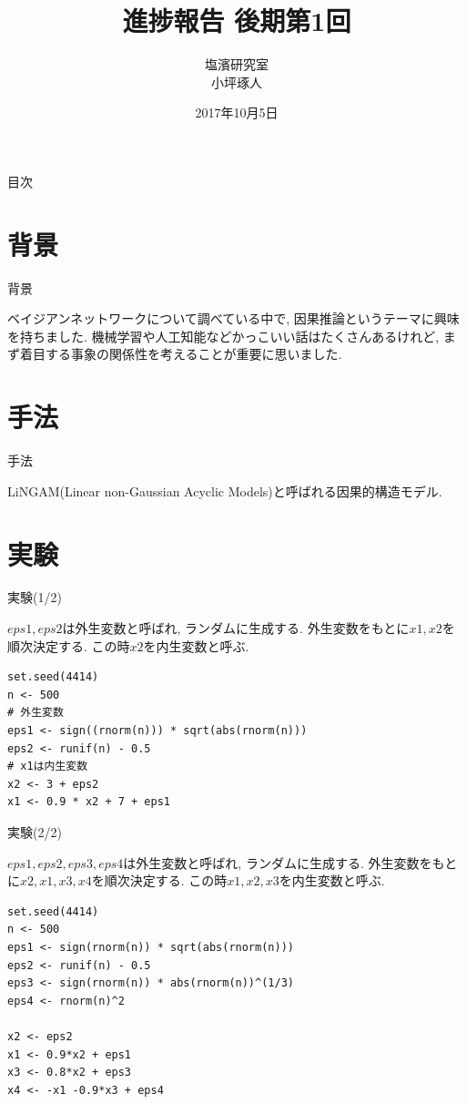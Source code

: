 \documentclass[dvipdfmx]{beamer}
\title[タイトル]{進捗報告 後期第1回}
\author[発表者名]{塩濱研究室\\小坪琢人}
\institute[所属]{東京理科大学\ 工学部経営工学科4年\\学籍番号 4414036}
\date[日付]{2017年10月5日}
\begin{document}
\begin{frame}[plain]
\titlepage
\end{frame}
	
\begin{frame}{目次}
\tableofcontents
\end{frame}

\section{背景}
\begin{frame}{背景}

ベイジアンネットワークについて調べている中で, 因果推論というテーマに興味を持ちました.
機械学習や人工知能などかっこいい話はたくさんあるけれど, まず着目する事象の関係性を考えることが重要に思いました.

\end{frame}

\section{手法}
\begin{frame}{手法}

LiNGAM(Linear non-Gaussian Acyclic Models)と呼ばれる因果的構造モデル.

\end{frame}

\section{実験}
\begin{frame}[containsverbatim]{実験(1/2)}

$eps1, eps2$は外生変数と呼ばれ, ランダムに生成する. 外生変数をもとに$x1,x2$を順次決定する. この時$x2$を内生変数と呼ぶ.

\begin{lstlisting}[caption = LiNGAMの実行例1]
set.seed(4414)
n <- 500
# 外生変数
eps1 <- sign((rnorm(n))) * sqrt(abs(rnorm(n))) 
eps2 <- runif(n) - 0.5
# x1は内生変数
x2 <- 3 + eps2
x1 <- 0.9 * x2 + 7 + eps1
\end{lstlisting}

\end{frame}

\begin{frame}[containsverbatim]{実験(2/2)}

$eps1, eps2, eps3, eps4$は外生変数と呼ばれ, ランダムに生成する. 外生変数をもとに$x2,x1,x3,x4$を順次決定する. この時$x1,x2,x3$を内生変数と呼ぶ.

\begin{lstlisting}[caption = LiNGAMの実行例2]
set.seed(4414)
n <- 500 
eps1 <- sign(rnorm(n)) * sqrt(abs(rnorm(n))) 
eps2 <- runif(n) - 0.5 
eps3 <- sign(rnorm(n)) * abs(rnorm(n))^(1/3) 
eps4 <- rnorm(n)^2

x2 <- eps2 
x1 <- 0.9*x2 + eps1 
x3 <- 0.8*x2 + eps3 
x4 <- -x1 -0.9*x3 + eps4
\end{lstlisting}

\end{frame}
\end{document}
